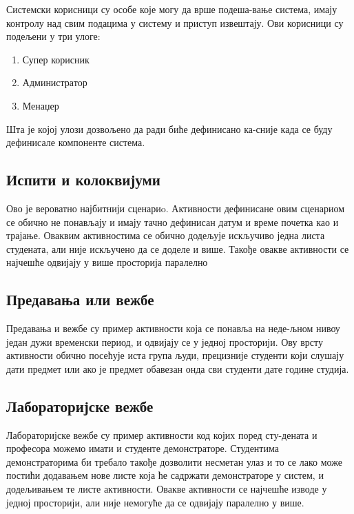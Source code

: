 \documentclass[a4paper, 12pt, diplomski]{etfcyr}
\makeatletter
\newcommand{\indentfirstparagraphon}{
	\renewenvironment{justify}{%
		\trivlist
		\justifying
		\itemindent\JustifyingParindent
	\item\relax
	}{
		\endtrivlist
	}
}
\gdef\tshortstack{\@ifnextchar[\@tshortstack{\@tshortstack[c]}}
\let\@tshortstack\@shortstack
\makeatother
\begin{document}
\begin{labeling}{\smash{\tshortstack[l]{Корисник\\лабораторије}}}
					\item[\smash{\tshortstack[l]{Системски\\корисник}}]
						\begin{justify}
							Системски корисници су особе које могу да врше подеша-вање система, имају контролу над свим подацима у систему и приступ извештају. Ови корисници су подељени у три улоге:
							\begin{enumerate}[noitemsep]
								\item Супер корисник
								\item Администратор
								\item Менаџер
							\end{enumerate}
							Шта је којој улози дозвољено да ради биће дефинисано ка-сније када се буду дефинисале компоненте система.
						\end{justify}
					\indentfirstparagraphon
				\end{labeling}

			\subsection[Сценарио 1]{Испити и колоквијуми}
				\begin{justify}
				Ово је вероватно најбитнији сценариo. Активности дефинисане овим сценариом се обично не понављају и имају тачно дефинисан датум и време почетка као и трајање. Оваквим активностима се обично додељује искључиво једна листа студената, али није искључено да се доделе и више. Такође овакве активности се најчешће одвијају у више просторија паралелно
				\end{justify}

			\subsection[Сценарио 2]{Предавања или вежбе}
				\begin{justify}
					Предавања и вежбе су пример активности која се понавља на неде-љном нивоу један дужи временски период, и одвијају се у једној просторији. Ову врсту активности обично посећује иста група људи, прецизније студенти који слушају дати предмет или ако је предмет обавезан онда сви студенти дате године студија.
				\end{justify}

			\subsection[Сценарио 3]{Лабораторијске вежбе}
				\begin{justify}
					Лабораторијске вежбе су пример активности код којих поред сту-дената и професора можемо имати и студенте демонстраторе. Студентима демонстраторима би требало такође дозволити несметан улаз и то се лако може постићи додавањем нове листе која ће садржати демонстраторе у систем, и додељивањем те листе активности. Овакве активности се најчешће изводе у једној просторији, али није немогуће да се одвијају паралелно у више.
				\end{justify}
\end{document}

